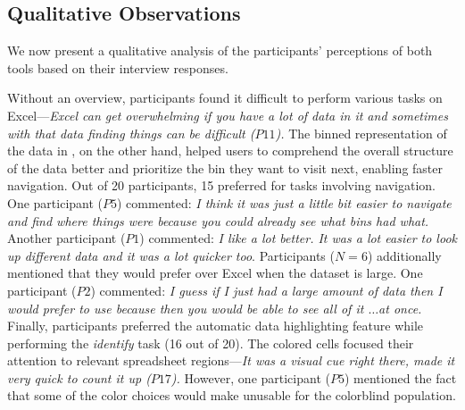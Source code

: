 \subsection{Qualitative Observations}
\label{sec:interview_result}\label{sec:survey_result}
We now present a qualitative analysis of the participants' perceptions of both tools based on their interview responses.

Without an overview, participants found it difficult to 
perform various tasks on Excel---\emph{Excel can get overwhelming 
if you have a lot of data in it and sometimes with that data 
finding things can be difficult ($P11$).} 
The binned representation of the data in \noah, 
on the other hand, helped users to comprehend 
the overall structure of the data better 
and prioritize the bin they want to visit next, enabling faster navigation. 
Out of 20 participants, 15 preferred \noah for tasks involving navigation. 
One participant ($P5$) commented: 
\emph{I think it was just a little bit easier to navigate 
and find where things were because you could already see what bins had what.} 
Another participant ($P1$) commented:  
\emph{I like \noah a lot better. It was a lot easier to look up different data 
and it was a lot quicker too}. 
Participants ($N=6$) additionally mentioned 
that they would prefer \noah over Excel when the dataset is large. 
One participant ($P2$) commented: 
\emph{I guess if I just had a large amount of data 
then I would prefer to use \noah because then you 
would be able to see all of it $\ldots$at once.} 
Finally, participants preferred the automatic data highlighting 
feature while performing the \emph{identify} task (16 out of 20). 
The colored cells focused their attention 
to relevant spreadsheet regions---\emph{It was a visual 
cue right there, made it very quick to count it up ($P17$).}
However, one participant ($P5$) mentioned the fact that 
some of the color choices would make \noah unusable 
for the colorblind population.


